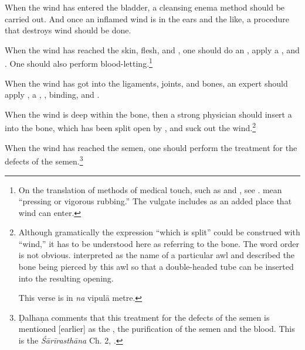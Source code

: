 \begin{translation}
    \item [6] When the wind has entered the bladder, a cleansing enema method
should be carried out. And once an inflamed wind is in the ears and the like,
a procedure that destroys wind should be done.

    \item [7]
    When the wind has reached the skin, flesh, and , one should do 
    an 
    , apply a ,  
     and . One should also 
    perform blood-letting.\footnote{On the translation of methods of 
    medical touch, such as  and , see 
    \cite[122--131]{broo-2021}.\label{massage-terms}   mean “pressing or 
    vigorous rubbing.”  The vulgate includes 
     as an added place that wind can enter.}

    \item[8]
    When the wind has got into the ligaments, joints, and bones, an expert 
    should apply  ,  a ,
    , binding, and .



    \item [9] When the wind is deep within the bone, then a strong
physician should insert a  into the bone, which has
been split open by , and suck out
the wind.\footnote{Although gramatically the expression “which is
    split” could be construed with “wind,” it has to be understood
    here as referring to the bone.  The word order is not obvious. 
     interpreted  as the name of a
    particular awl and described the bone being pierced by this awl so
    that a double-headed tube can be inserted into the resulting
    opening.
    
    This verse is in \emph{na} vipulā metre.}
         
         
          

    \item[10ab]
    When the wind has reached the semen, one should perform the treatment 
    for the defects of the semen.\footnote{Ḍalhaṇa comments 
    \citep[421]{vulgate} that this treatment for the defects of the semen is 
    mentioned [earlier] as the , the purification of the 
    semen and the blood. This is the \emph{Śārīrasthāna} Ch. 2, 
    .}
    

\end{translation}
